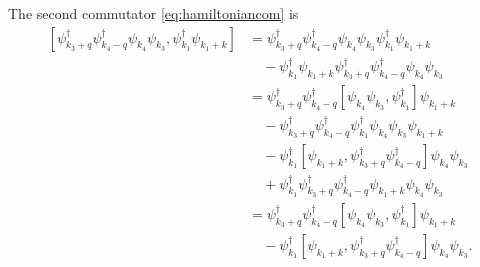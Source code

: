 \documentclass[11pt, a4paper]{report} %
\begin{document}
The second commutator \cref{eq:hamiltoniancom} is 
\begin{align}
  \label{eq:8}
  [\psi_{k_3+q}^{\dag}\psi_{k_4-q}^{\dag}\psi_{k_4}\psi_{k_3}, \psi_{k_1}^{\dag}\psi_{k_1+k}] &= 
\psi_{k_3+q}^{\dag}\psi_{k_4-q}^{\dag}\psi_{k_4}\psi_{k_3}\psi_{k_1}^{\dag}\psi_{k_1+k} \nonumber\\
& \quad - \psi_{k_1}^{\dag}\psi_{k_1+k}\psi_{k_3+q}^{\dag}\psi_{k_4-q}^{\dag}\psi_{k_4}\psi_{k_3}\\
&=\psi_{k_3+q}^{\dag}\psi_{k_4-q}^{\dag}[\psi_{k_4}\psi_{k_3},\psi_{k_1}^{\dag}]\psi_{k_1+k} \nonumber\\
& \quad - \psi_{k_3+q}^{\dag}\psi_{k_4-q}^{\dag}\psi_{k_1}^{\dag}\psi_{k_4}\psi_{k_3}\psi_{k_1+k} \nonumber\\\
& \quad - \psi_{k_1}^{\dag}[\psi_{k_1+k},\psi_{k_3+q}^{\dag}\psi_{k_4-q}^{\dag}]\psi_{k_4}\psi_{k_3} \nonumber\\
& \quad+ \psi_{k_1}^{\dag}\psi_{k_3+q}^{\dag}\psi_{k_4-q}^{\dag}\psi_{k_1+k}\psi_{k_4}\psi_{k_3}\\
&=\psi_{k_3+q}^{\dag}\psi_{k_4-q}^{\dag}[\psi_{k_4}\psi_{k_3},\psi_{k_1}^{\dag}]\psi_{k_1+k} \nonumber\\
& \quad - \psi_{k_1}^{\dag}[\psi_{k_1+k},\psi_{k_3+q}^{\dag}\psi_{k_4-q}^{\dag}]\psi_{k_4}\psi_{k_3}.
\end{align}
\end{document}
